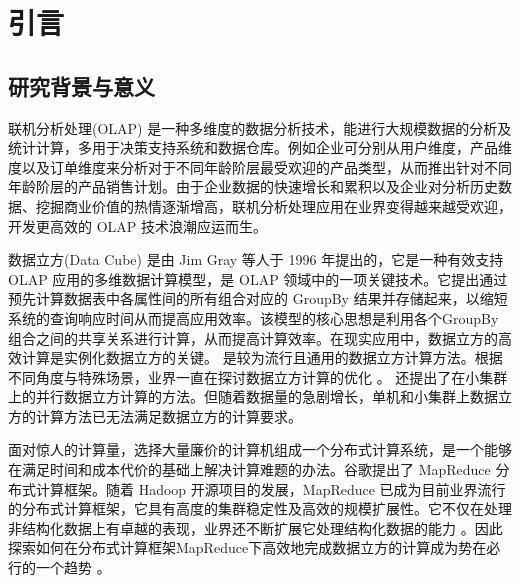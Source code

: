 \chapter{引言}

\section{研究背景与意义}
联机分析处理(OLAP) \cite{chaudhuri1997overview} 是一种多维度的数据分析技术，能进行大规模数据的分析及统计计算，多用于决策支持系统和数据仓库。例如企业可分别从用户维度，产品维度以及订单维度来分析对于不同年龄阶层最受欢迎的产品类型，从而推出针对不同年龄阶层的产品销售计划。由于企业数据的快速增长和累积以及企业对分析历史数据、挖掘商业价值的热情逐渐增高，联机分析处理应用在业界变得越来越受欢迎，开发更高效的 OLAP 技术浪潮应运而生。

数据立方(Data Cube) \cite{gray1997data}是由 Jim Gray 等人于 1996 年提出的，它是一种有效支持 OLAP 应用的多维数据计算模型，是 OLAP 领域中的一项关键技术。它提出通过预先计算数据表中各属性间的所有组合对应的 GroupBy 结果并存储起来，以缩短系统的查询响应时间从而提高应用效率。该模型的核心思想是利用各个GroupBy组合之间的共享关系进行计算，从而提高计算效率。在现实应用中，数据立方的高效计算是实例化数据立方的关键。 \cite{agarwal1996computation} \cite{beyer1999bottom} 是较为流行且通用的数据立方计算方法。根据不同角度与特殊场景，业界一直在探讨数据立方计算的优化 \cite{xin2003star} \cite{harinarayan1996implementing} \cite{zhao1997array} \cite{han2001efficient} \cite{wang2002condensed}。\cite{ng2001iceberg} \cite{dehne2002parallelizing} 还提出了在小集群上的并行数据立方计算的方法。但随着数据量的急剧增长，单机和小集群上数据立方的计算方法已无法满足数据立方的计算要求。


面对惊人的计算量，选择大量廉价的计算机组成一个分布式计算系统，是一个能够在满足时间和成本代价的基础上解决计算难题的办法。谷歌提出了 MapReduce \cite{dean2008mapreduce}分布式计算框架。随着 Hadoop \cite{hadoop}开源项目的发展，MapReduce 已成为目前业界流行的分布式计算框架，它具有高度的集群稳定性及高效的规模扩展性。它不仅在处理非结构化数据上有卓越的表现，业界还不断扩展它处理结构化数据的能力 \cite{hbase} \cite{abouzeid2009hadoopdb} \cite{buck2011scihadoop} \cite{pig} \cite{hive}。因此探索如何在分布式计算框架MapReduce下高效地完成数据立方的计算成为势在必行的一个趋势
 \cite{abello2011building} \cite{wang2010mapreducemerge} \cite{sergey2009applying} \cite{lee2012efficient} \cite{wang2013scalable}。




